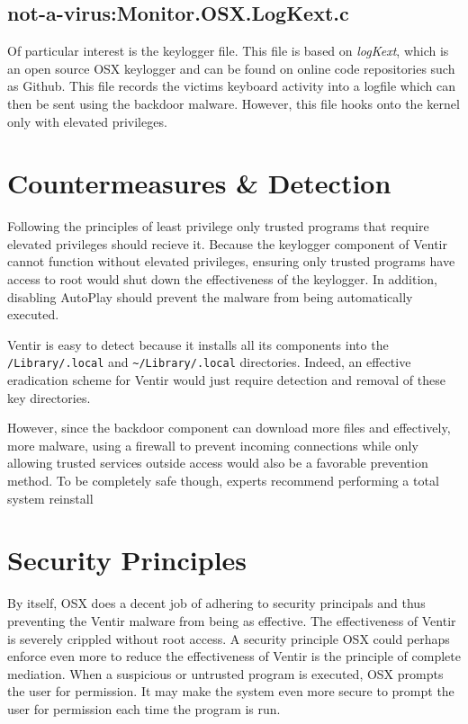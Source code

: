 \documentclass[conference]{IEEEtran}
\begin{document}
\subsection{not-a-virus:Monitor.OSX.LogKext.c}
Of particular interest is the keylogger file. This file is based on
\textit{logKext}, which is an open source OSX keylogger and can be found on
online code repositories such as Github\cite{logkext}. This file records the
victims keyboard activity into a logfile which can then be sent using the
backdoor malware. However, this file hooks onto the kernel only with elevated
privileges\cite{erwin_ventir_2014}.

\section{Countermeasures \& Detection}

Following the principles of least privilege only trusted programs that require
elevated privileges should recieve it. Because the keylogger component of Ventir
cannot function without elevated privileges, ensuring only trusted programs have
access to root would shut down the effectiveness of the keylogger. In
addition, disabling AutoPlay should prevent the malware from being automatically
executed.

Ventir is easy to detect because it installs all its components into the
\lstinline[basicstyle=\ttfamily]|/Library/.local| and
\lstinline[basicstyle=\ttfamily]|~/Library/.local| directories. Indeed, an
effective eradication scheme for Ventir would just require detection and removal
of these key directories\cite{salmela_roll}.

However, since the backdoor component can download more files and effectively,
more malware, using a firewall to prevent incoming connections while only
allowing trusted services outside access would also be a favorable prevention
method. To be completely safe though, experts recommend performing a total
system reinstall

\section{Security Principles}
By itself, OSX does a decent job of adhering to security principals and thus
preventing the Ventir malware from being as effective. The effectiveness of
Ventir is severely crippled without root access. A security principle OSX could
perhaps enforce even more to reduce the effectiveness of Ventir is the principle
of complete mediation. When a suspicious or untrusted program is executed, OSX
prompts the user for permission. It may make the system even more secure to
prompt the user for permission each time the program is run.
\end{document}
